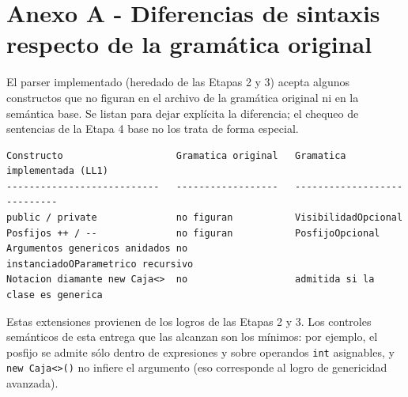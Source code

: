 \documentclass[11pt,a4paper]{article}
\begin{document}
\section{Anexo A - Diferencias de sintaxis respecto de la gramática original}

El parser implementado (heredado de las Etapas 2 y 3) acepta algunos constructos
que no figuran en el archivo de la gramática original ni en la semántica base. Se
listan para dejar explícita la diferencia; el chequeo de sentencias de la Etapa 4
base no los trata de forma especial.

{\footnotesize
\begin{verbatim}
Constructo                    Gramatica original   Gramatica implementada (LL1)
---------------------------   ------------------   ----------------------------
public / private              no figuran           VisibilidadOpcional
Posfijos ++ / --              no figuran           PosfijoOpcional
Argumentos genericos anidados no                   instanciadoOParametrico recursivo
Notacion diamante new Caja<>  no                   admitida si la clase es generica
\end{verbatim}
}

Estas extensiones provienen de los logros de las Etapas 2 y 3. Los controles
semánticos de esta entrega que las alcanzan son los mínimos: por ejemplo, el
posfijo se admite sólo dentro de expresiones y sobre operandos \texttt{int}
asignables, y \texttt{new Caja<>()} no infiere el argumento (eso corresponde al
logro de genericidad avanzada).
\end{document}
